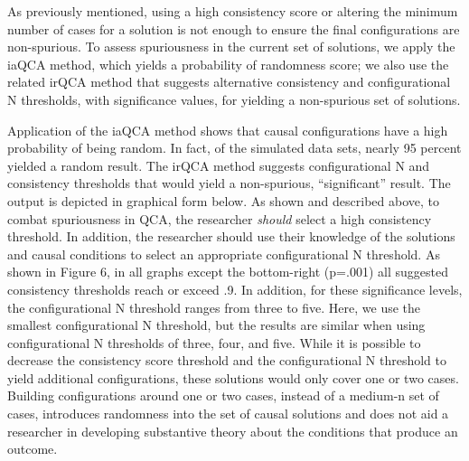 \documentclass[]{article}
\begin{document}
{As previously mentioned, using a high consistency score or altering the minimum number of cases for a solution is not enough to ensure the final configurations are non-spurious. To assess spuriousness in the current set of solutions, we apply the iaQCA method, which yields a probability of randomness score; we also use the related irQCA method that suggests alternative consistency and configurational N thresholds, with significance values, for yielding a non-spurious set of solutions. 

Application of the iaQCA method shows that causal configurations have a high probability of being random. In fact, of the simulated data sets, nearly 95 percent yielded a random result. The irQCA method suggests configurational N and consistency thresholds that would yield a non-spurious, ``significant'' result. The output is depicted in graphical form below. As shown and described above, to combat spuriousness in QCA, the researcher {\it{should}} select a high consistency threshold. In addition, the researcher should use their knowledge of the solutions and causal conditions to select an appropriate configurational N threshold. As shown in Figure 6, in all graphs except the bottom-right (p=.001) all suggested consistency thresholds reach or exceed .9. In addition, for these significance levels, the configurational N threshold ranges from three to five. Here, we use the smallest configurational N threshold, but the results are similar when using configurational N thresholds of three, four, and five. While it is possible to decrease the consistency score threshold and the configurational N threshold to yield additional configurations, these solutions would only cover one or two cases. Building configurations around one or two cases, instead of a medium-n set of cases, introduces randomness into the set of causal solutions and does not aid a researcher in developing substantive theory about the conditions that produce an outcome.

}
\end{document}
